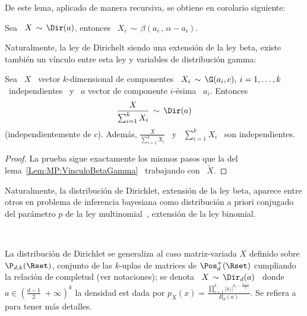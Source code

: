 De este lema, aplicado de manera recursiva, se obtiene en corolario siguiente:
%
\begin{corolario}
\label{Cor:MP:MarginalDirichletBeta}
%
  Sea  \ $X  \,  \sim \,  \Dir(a)$, entonces  \  $\displaystyle X_i  \, \sim  \,
  \beta\left( a_i \, , \, \alpha-a_i \right)$.
\end{corolario}

Naturalmente, la ley de Dirichelt siendo  una extensi\'on de la ley beta, existe
tambi\'en un v\'inculo entre esta ley y variables de distribuci\'on gamma:
%
\begin{lema}
\label{Lem:MP:VinculoDirichletGamma}
%
Sea \ $X$  \ vector $k$-dimensional de componentes \ $X_i  \, \sim \, \G(a_i,c),
\:  i  = 1,  \ldots  , k$  \  independientes  \ y  \  $a$  vector de  componente
$i$-\'esima \ $a_i$. Entonces
  \[
  \frac{X}{\sum_{i=1}^k X_i} \, \sim \, \Dir(a)
  \]
  (independientemente  de $c$).   Adem\'as, $\frac{X}{\sum_{i=1}^k  X_i}$ \  y \
  $\sum_{i=1}^k X_i$ \ son independientes.
\end{lema}
%
\begin{proof}
  La    prueba   sigue    exactamente   los    mismos   pasos    que    la   del
  lema~\ref{Lem:MP:VinculoBetaGamma} \ trabajando con \ $\widetilde{X}$.
\end{proof}

Naturalmente,  la  distribuci\'on de  Dirichlet,  extensi\'on  de  la ley  beta,
aparece entre  otros en problema  de inferencia bayesiana como  distribuci\'on a
priori  conjugado  del  par\'ametro  $p$  de  la  ley  multinomial~\cite{Rob07},
extensi\'on de la ley binomial.


\

La distribuci\'on de Dirichlet se generaliza al caso matriz-variada $X$ definido
sobre $\P_{d,k}(\Rset)$,  conjunto de las  $k$-uplas de matrices  de $\Pos_d^+(\Rset)$
cumpliando la relaci\'on  de completud (ver notaciones); se denota  \ $X \, \sim
\, \Dir_d(a)$  \ donde \  $a \in \left(  \frac{d-1}{2} \; +\infty  \right)^k$ la
densidad  est dada por  $\displaystyle p_X(x)  = \frac{\prod_{i=1}^k  \left| x_i
  \right|^{a_i-\frac{d+1}{2}}}{B_d(a)}$.   Se  refiera a~\cite[Cap.~6]{GupNag99}
para tener m\'as detalles.
